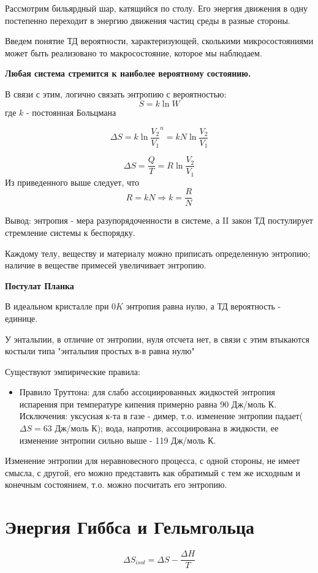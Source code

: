\documentclass[11pt]{article}
\begin{document}
Рассмотрим бильярдный шар, катящийся по столу. Его энергия движения в одну постепенно переходит в энергию движения частиц среды в разные стороны.

Введем понятие ТД вероятности, характеризующей, сколькими микросостояниями может быть реализовано то макросостояние, которое мы наблюдаем.

\textbf{Любая система стремится к наиболее вероятному состоянию.} 

В связи с этим, логично связать энтропию с вероятностью:
$$S=k\ln W$$
где $k$ - постоянная Больцмана

$$\Delta S = k \ln \frac{V_2}{V_1}^n = kN\ln \frac{V_2}{V_1}$$

$$\Delta S = \frac{Q}{T} = R\ln\frac{V_2}{V_1}$$
Из приведенного выше следует, что 
$$R=kN \Rightarrow k=\frac RN$$

Вывод: энтропия - мера разупорядоченности в системе, а II закон ТД постулирует стремление системы к беспорядку.

Каждому телу, веществу и материалу можно приписать определенную энтропию; наличие в веществе примесей увеличивает энтропию.

\textbf{Постулат Планка}

В идеальном кристалле при $0 K$ энтропия равна нулю, а ТД вероятность - единице.

У энтальпии, в отличие от энтропии, нуля отсчета нет, в связи с этим втыкаются костыли типа "энтальпия простых в-в равна нулю"

Существуют эмпирические правила:
\begin{itemize}
\item Правило Труттона: для слабо ассоциированных жидкостей энтропия испарения при температуре кипения примерно равна 90 Дж/моль К. Исключения: уксусная к-та в газе - димер, т.о. изменение энтропии падает($\Delta S =63$ Дж/моль К); вода, напротив, ассоциирована в жидкости, ее изменение энтропии сильно выше - 119 Дж/моль К. 
\end{itemize}

Изменение энтропии для неравновесного процесса, с одной стороны, не имеет смысла, с другой, его можно представить как обратимый с тем же исходным и конечным состоянием, т.о. можно посчитать его энтропию.

\section{Энергия Гиббса и Гельмгольца}

$$\Delta S _{isol} = \Delta S - \frac{\Delta H}{T}$$
\end{document}
